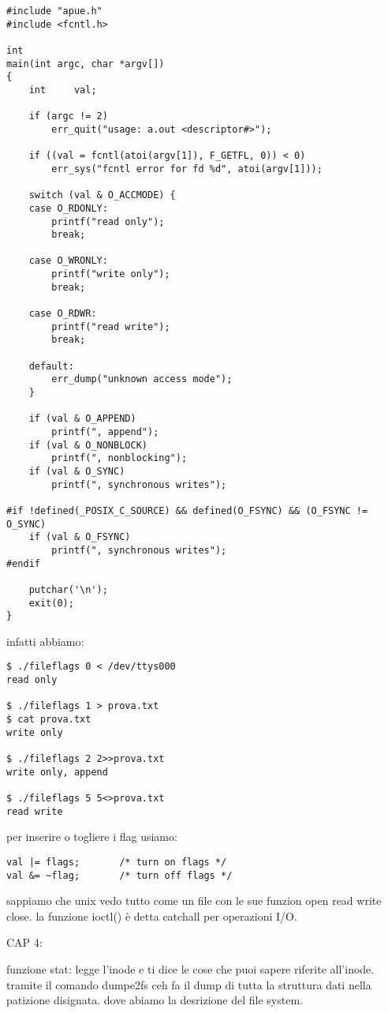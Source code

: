 \begin{lstlisting}
#include "apue.h"
#include <fcntl.h>

int
main(int argc, char *argv[])
{
	int		val;

	if (argc != 2)
		err_quit("usage: a.out <descriptor#>");

	if ((val = fcntl(atoi(argv[1]), F_GETFL, 0)) < 0)
		err_sys("fcntl error for fd %d", atoi(argv[1]));

	switch (val & O_ACCMODE) {
	case O_RDONLY:
		printf("read only");
		break;

	case O_WRONLY:
		printf("write only");
		break;

	case O_RDWR:
		printf("read write");
		break;

	default:
		err_dump("unknown access mode");
	}

	if (val & O_APPEND)
		printf(", append");
	if (val & O_NONBLOCK)
		printf(", nonblocking");
	if (val & O_SYNC)
		printf(", synchronous writes");

#if !defined(_POSIX_C_SOURCE) && defined(O_FSYNC) && (O_FSYNC != O_SYNC)
	if (val & O_FSYNC)
		printf(", synchronous writes");
#endif

	putchar('\n');
	exit(0);
}	
\end{lstlisting}

infatti abbiamo:

\begin{lstlisting}
$ ./fileflags 0 < /dev/ttys000
read only

$ ./fileflags 1 > prova.txt
$ cat prova.txt 
write only

$ ./fileflags 2 2>>prova.txt 
write only, append

$ ./fileflags 5 5<>prova.txt 
read write
\end{lstlisting}

per inserire o togliere i flag usiamo:

\begin{lstlisting}
val |= flags;		/* turn on flags */
val &= ~flag;		/* turn off flags */
\end{lstlisting}





sappiamo che unix vedo tutto come un file con le sue funzion open read write close. la funzione ioctl() è detta catchall per operazioni I/O.





CAP 4:

funzione stat: legge l'inode e ti dice le cose che puoi sapere riferite all'inode. tramite il comando dumpe2fs ceh fa il dump di tutta la struttura dati nella patizione disignata. dove abiamo la desrizione del file system.

